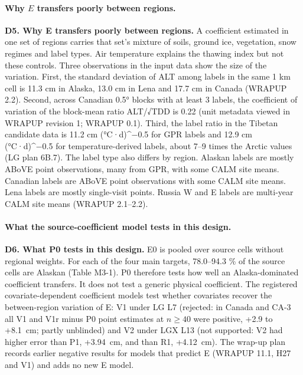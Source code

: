 \paragraph*{Why $E$ transfers poorly between regions.} \textbf{D5. Why E transfers poorly between regions.} A coefficient estimated in one set of regions carries that set's mixture of soils, ground ice, vegetation, snow regimes and label types. Air temperature explains the thawing index but not these controls. Three observations in the input data show the size of the variation. First, the standard deviation of ALT among labels in the same 1 km cell is 11.3 cm in Alaska, 13.0 cm in Lena and 17.7 cm in Canada (WRAPUP 2.2). Second, across Canadian 0.5° blocks with at least 3 labels, the coefficient of variation of the block-mean ratio ALT/√TDD is 0.22 (unit metadata viewed in WRAPUP revision 1; WRAPUP 0.1). Third, the label ratio in the Tibetan candidate data is 11.2 cm (°C·d)\textasciicircum{}−0.5 for GPR labels and 12.9 cm (°C·d)\textasciicircum{}−0.5 for temperature-derived labels, about 7–9 times the Arctic values (LG plan 6B.7). The label type also differs by region. Alaskan labels are mostly ABoVE point observations, many from GPR, with some CALM site means. Canadian labels are ABoVE point observations with some CALM site means. Lena labels are mostly single-visit points. Russia W and E labels are multi-year CALM site means (WRAPUP 2.1–2.2).

\paragraph*{What the source-coefficient model tests in this design.} \textbf{D6. What P0 tests in this design.} E0 is pooled over source cells without regional weights. For each of the four main targets, 78.0–94.3 \% of the source cells are Alaskan (Table M3-1). P0 therefore tests how well an Alaska-dominated coefficient transfers. It does not test a generic physical coefficient. The registered covariate-dependent coefficient models test whether covariates recover the between-region variation of E: V1 under LG L7 (rejected: in Canada and CA-3 all V1 and V1r minus P0 point estimates at $n \geq 40$ were positive, +2.9 to +8.1~cm; partly unblinded) and V2 under LGX L13 (not supported: V2 had higher error than P1, +3.94~cm, and than R1, +4.12~cm). The wrap-up plan records earlier negative results for models that predict E (WRAPUP 11.1, H27 and V1) and adds no new E model.

